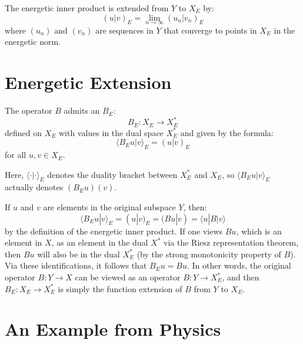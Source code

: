 \documentclass{article}
\newcommand{\tmtextbf}[1]{\text{{\bfseries{#1}}}}
\begin{document}
The energetic inner product is extended from $Y$ to $X_E$ by:
\begin{equation}
  (u|v)_E = \lim_{n \to \infty} (u_n |v_n)_E
\end{equation}
where $(u_n)$ and $(v_n)$ are sequences in $Y$ that converge to points in
$X_E$ in the energetic norm.

\section*{Energetic Extension}

The operator $B$ admits an \tmtextbf{energetic extension} $B_E$:
\begin{equation}
  B_E : X_E \to X_E^{\ast}
\end{equation}
defined on $X_E$ with values in the dual space $X_E^{\ast}$ and given by the
formula:
\begin{equation}
  \langle B_E u|v \rangle_E = (u|v)_E
\end{equation}
for all $u, v \in X_E$.

Here, $\langle \cdot | \cdot \rangle_E$ denotes the duality bracket between
$X_E^{\ast}$ and $X_E$, so $\langle B_E u|v \rangle_E$ actually denotes $(B_E
u) (v)$.

If $u$ and $v$ are elements in the original subspace $Y$, then:
\[ \langle B_E u|v \rangle_E = (u|v)_E = (Bu|v) = \langle u|B|v \rangle \]
by the definition of the energetic inner product. If one views $Bu$, which is
an element in $X$, as an element in the dual $X^{\ast}$ via the Riesz
representation theorem, then $Bu$ will also be in the dual $X_E^{\ast}$ (by
the strong monotonicity property of $B$). Via these identifications, it
follows that $B_E u = Bu$. In other words, the original operator $B : Y \to X$
can be viewed as an operator $B : Y \to X_E^{\ast}$, and then $B_E : X_E \to
X_E^{\ast}$ is simply the function extension of $B$ from $Y$ to $X_E$.

\section*{An Example from Physics}
\end{document}
